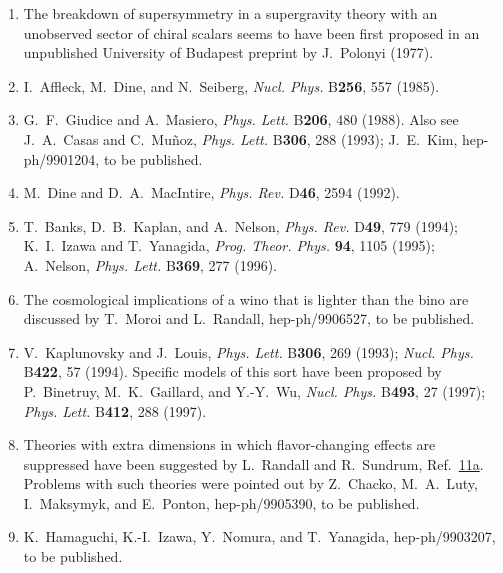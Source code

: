 \begin{enumerate}
  \item {}\label{ch31-ref-15}
  The breakdown of supersymmetry in a supergravity theory with an
  unobserved sector of chiral scalars seems to have been first proposed
  in an unpublished University of Budapest preprint by J.~Polonyi
  (1977).

  \item {}\label{ch31-ref-16}
  I.~Affleck, M.~Dine, and N.~Seiberg, \textit{Nucl. Phys.}
  B\textbf{256}, 557 (1985).

  \item {}\label{ch31-ref-17}
  G.~F.~Giudice and A.~Masiero, \textit{Phys. Lett.} B\textbf{206},
  480 (1988). Also see J.~A.~Casas and C.~Mu\~noz,
  \textit{Phys. Lett.} B\textbf{306}, 288 (1993); J.~E.~Kim,
  hep-ph/9901204, to be published.

  \item {}\label{ch31-ref-18}
  M.~Dine and D.~A.~MacIntire, \textit{Phys. Rev.} D\textbf{46}, 2594
  (1992).

  \item {}\label{ch31-ref-19}
  T.~Banks, D.~B.~Kaplan, and A.~Nelson, \textit{Phys. Rev.}
  D\textbf{49}, 779 (1994); K.~I.~Izawa and T.~Yanagida,
  \textit{Prog. Theor. Phys.} \textbf{94}, 1105 (1995); A.~Nelson,
  \textit{Phys. Lett.} B\textbf{369}, 277 (1996).

  \item[19a.] \label{ch31-ref-19a}
  The cosmological implications of a wino that is lighter than the bino
  are discussed by T.~Moroi and L.~Randall, hep-ph/9906527, to be
  published.

  \item {}\label{ch31-ref-20}
  V.~Kaplunovsky and J.~Louis, \textit{Phys. Lett.} B\textbf{306}, 269
  (1993); \textit{Nucl. Phys.} B\textbf{422}, 57 (1994). Specific
  models of this sort have been proposed by P.~Binetruy,
  M.~K.~Gaillard, and Y.-Y.~Wu, \textit{Nucl. Phys.} B\textbf{493}, 27
  (1997); \textit{Phys. Lett.} B\textbf{412}, 288 (1997).

  \item {}\label{ch31-ref-21}
  Theories with extra dimensions in which flavor-changing effects are
  suppressed have been suggested by L.~Randall and R.~Sundrum,
  Ref.~\hyperref[ch31-ref-11a]{11a}. Problems with such theories were
  pointed out by Z.~Chacko, M.~A.~Luty, I.~Maksymyk, and E.~Ponton,
  hep-ph/9905390, to be published.

  \item {}\label{ch31-ref-22}
  K.~Hamaguchi, K.-I.~Izawa, Y.~Nomura, and T.~Yanagida,
  hep-ph/9903207, to be published.
\end{enumerate}
